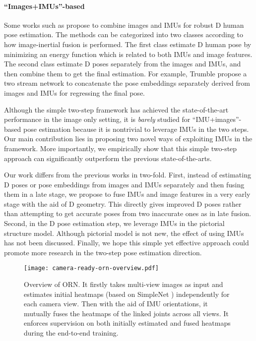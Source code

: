 \documentclass[10pt,twocolumn,letterpaper]{article}
\begin{document}
\paragraph{``Images+IMUs''-based}
Some works such as \cite{von2016human,trumble2017total,von2018recovering,gilbert2019fusing,malleson2017real} propose to combine images and IMUs for robust D human pose estimation. The methods can be categorized into two classes according to how image-inertial fusion is performed. The first class \cite{malleson2017real,von2018recovering,von2016human} estimate D human pose by minimizing an energy function which is related to both IMUs and image features. The second class \cite{trumble2017total,gilbert2019fusing} estimate D poses separately from the images and IMUs, and then combine them to get the final estimation. For example, Trumble \etal \cite{trumble2017total,gilbert2019fusing} propose a two stream network to concatenate the pose embeddings separately derived from images and IMUs for regressing the final pose. 

Although the simple two-step framework has achieved the state-of-the-art performance in the image only setting, it is \emph{barely} studied for ``IMU+images''-based pose estimation because it is nontrivial to leverage IMUs in the two steps. Our main contribution lies in proposing two novel ways of exploiting IMUs in the framework. More importantly, we empirically show that this simple two-step approach can significantly outperform the previous state-of-the-arts. 

Our work differs from the previous works \cite{trumble2017total,von2018recovering,gilbert2019fusing,malleson2017real,loper2015smpl} in two-fold. First, instead of estimating D poses or pose embeddings from images and IMUs separately and then fusing them in a late stage, we propose to fuse IMUs and image features in a very early stage with the aid of D geometry. This directly gives improved D poses rather than attempting to get accurate poses from two inaccurate ones as in late fusion. Second, in the D pose estimation step, we leverage IMUs in the pictorial structure model. Although pictorial model is not new, the effect of using IMUs has not been discussed. Finally, we hope this simple yet effective approach could promote more research in the two-step pose estimation direction.

\begin{figure}
	\centering
	\texttt{[image: camera-ready-orn-overview.pdf]}
	\caption{Overview of ORN. It firstly takes multi-view images as input and estimates initial heatmaps (based on SimpleNet \cite{simplebaselines}) independently for each camera view. Then with the aid of IMU orientations, it mutually fuses the heatmaps of the linked joints across all views. It enforces supervision on both initially estimated and fused heatmaps during the end-to-end training.}
	\label{fig:pipeline}
\end{figure}
\end{document}
